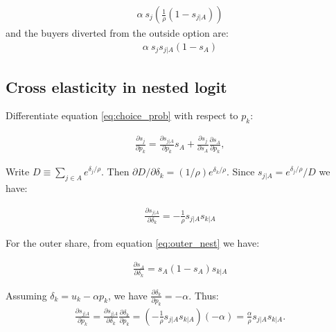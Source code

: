 \documentclass[12pt]{article}
\theoremstyle{plain}
\theoremstyle{plain}
\begin{document}
\begin{align}\label{eq:a6}
    \alpha \ s_j  \left(\frac{1}{\rho}(1-s_{j|A})\right)    
\end{align}
and the buyers diverted from the outside option are: 
\begin{align}\label{eq:a7}
    \alpha \ s_j  s_{j|A}  (1-s_A)  
\end{align}

\bigskip


\subsection{Cross elasticity in nested logit}\label{sec:appendix1.1}


Differentiate  equation \ref{eq:choice_prob} with respect to $p_k$: 

\begin{align}\label{eq:app1}
    \frac{\partial s_j}{\partial p_k} = \frac{\partial s_{j|A}}{\partial p_k}s_A + \frac{\partial s_j}{\partial s_A}\frac{\partial s_A}{\partial p_k}, 
\end{align}



Write $D \equiv \sum_{j \in A} e^{\delta_j/\rho}$. Then  $\partial D/\partial\delta_k = (1/\rho)e^{\delta_k/\rho}$. Since $s_{j|A} = e^{\delta_j/\rho}/D$  we have: 

\begin{align}
    \frac{\partial s_{j|A}}{\partial \delta_k} %
    =-\frac{1}{\rho}s_{j|A}s_{k|A}
\end{align}


For the outer share, from equation \ref{eq:outer_nest} we have: 

\begin{align}
    \frac{\partial s_A}{\partial\delta_k} = s_A(1-s_A)s_{k|A}
\end{align}

Assuming $\delta_k = u_k - \alpha p_k$, we have $\frac{\partial\delta_k}{\partial p_k} = -\alpha$. Thus: 
\begin{align}\label{eq:app4}
    \frac{\partial s_{j|A}}{\partial p_k} = \frac{\partial s_{j|A}}{\partial \delta_k}\frac{\partial \delta_k}{\partial p_k} = \left(-\frac{1}{\rho}s_{j|A}s_{k|A}\right)(-\alpha) = \frac{\alpha}{\rho}s_{j|A}s_{k|A}.
\end{align}
\end{document}
